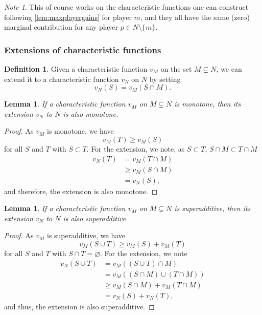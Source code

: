 \documentclass[12pt,letterpaper,final]{article}
\theoremstyle{plain}
\theoremstyle{plain}
\theoremstyle{plain}
\newtheorem{lemma}[theorem]{Lemma}
\theoremstyle{plain}
\theoremstyle{plain}
\theoremstyle{plain}
\theoremstyle{plain}
\theoremstyle{definition}
\newtheorem{definition}{Definition}[section]
\theoremstyle{definition}
\theoremstyle{definition}
\theoremstyle{definition}
\theoremstyle{definition}
\theoremstyle{remark}
\theoremstyle{remark}
\newtheorem*{note}{Note}
\theoremstyle{remark}
\theoremstyle{remark}
\begin{document}
\begin{note}
  This of course works on the characteristic functions one can
  construct following \cref{lem:maxplayergains} for player \(m\), and
  they all have the same (zero) marginal contribution for any player
  \(p \in N\setminus \{m\}\).
\end{note}

\subsubsection{Extensions of characteristic functions}

\begin{definition}
  Given a characteristic function \(v_M\)  on the set \(M\subsetneq N\), we can extend it to a
  characteristic function \(v_N\) on \(N\) by setting
  \[
    v_N(S) = v_M(S\cap M).
  \]
\end{definition}

\begin{lemma}
  If a characteristic function \(v_{M}\)  on \(M\subsetneq N\) is monotone, then its
  extension \(v_N\) to \(N\) is also monotone.
\end{lemma}

\begin{proof}
  As \(v_{M}\) is monotone, we have
  \[
    v_{M}(T) \geq v_{M}(S) 
  \]
  for all \(S\) and \(T\) with \(S\subset T\).
  For the extension, we note, as \(S\subset T\), \(S\cap M\subset
  T\cap M\)
  \begin{align*}
    v_{N}(T) &=v_{M}(T\cap M)\\
             &\geq v_M(S\cap M)\\
             &= v_N(S),
  \end{align*}
  and therefore, the extension is also monotone.
\end{proof}

\begin{lemma}
  If a characteristic function \(v_{M}\)  on \(M\subsetneq N\) is superadditive, then its
  extension \(v_N\) to \(N\) is also superadditive.
\end{lemma}

\begin{proof}
  As \(v_{M}\) is superadditive, we have
  \[
    v_{M}(S\cup T) \geq v_{M}(S) + v_{M}(T) 
  \]
  for all \(S\) and \(T\) with \(S\cap T = \varnothing\).
  For the extension, we note
  \begin{align*}
    v_{N}(S\cup T) &=v_{M}((S \cup T)\cap M)\\
                     &= v_{M}((S\cap M) \cup
                       (T\cap M))\\
                   &\geq v_M(S\cap M) + v_M(T\cap M)\\
                     &= v_N(S) + v_N(T),
  \end{align*}
  and thus, the extension is also superadditive.
\end{proof}
\end{document}
